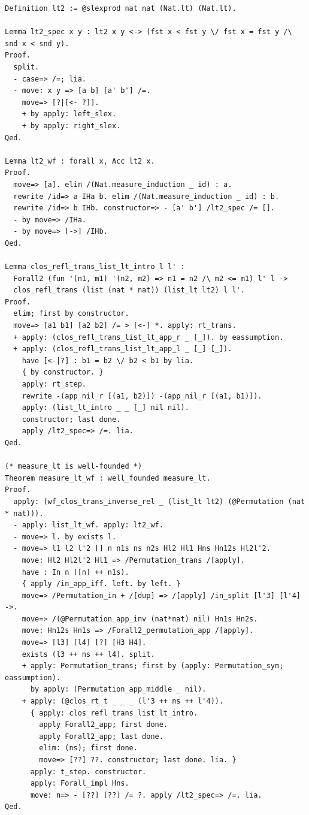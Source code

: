 \documentclass[10pt,a4paper]{article}
\begin{document}
\begin{lstlisting}[style=authorcoq]
Definition lt2 := @slexprod nat nat (Nat.lt) (Nat.lt).

Lemma lt2_spec x y : lt2 x y <-> (fst x < fst y \/ fst x = fst y /\ snd x < snd y).
Proof.
  split.
  - case=> /=; lia.
  - move: x y => [a b] [a' b'] /=.
    move=> [?|[<- ?]].
    + by apply: left_slex.
    + by apply: right_slex.
Qed.

Lemma lt2_wf : forall x, Acc lt2 x.
Proof.
  move=> [a]. elim /(Nat.measure_induction _ id) : a.
  rewrite /id=> a IHa b. elim /(Nat.measure_induction _ id) : b.
  rewrite /id=> b IHb. constructor=> - [a' b'] /lt2_spec /= [].
  - by move=> /IHa.
  - by move=> [->] /IHb.
Qed.

Lemma clos_refl_trans_list_lt_intro l l' :
  Forall2 (fun '(n1, m1) '(n2, m2) => n1 = n2 /\ m2 <= m1) l' l ->
  clos_refl_trans (list (nat * nat)) (list_lt lt2) l l'.
Proof.
  elim; first by constructor.
  move=> [a1 b1] [a2 b2] /= > [<-] *. apply: rt_trans.
  + apply: (clos_refl_trans_list_lt_app_r _ [_]). by eassumption.
  + apply: (clos_refl_trans_list_lt_app_l _ [_] [_]).
    have [<-|?] : b1 = b2 \/ b2 < b1 by lia.
    { by constructor. }
    apply: rt_step.
    rewrite -(app_nil_r [(a1, b2)]) -(app_nil_r [(a1, b1)]).
    apply: (list_lt_intro _ _ [_] nil nil).
    constructor; last done.
    apply /lt2_spec=> /=. lia.
Qed.

(* measure_lt is well-founded *)
Theorem measure_lt_wf : well_founded measure_lt.
Proof.
  apply: (wf_clos_trans_inverse_rel _ (list_lt lt2) (@Permutation (nat * nat))).
  - apply: list_lt_wf. apply: lt2_wf.
  - move=> l. by exists l.
  - move=> l1 l2 l'2 [] n n1s ns n2s Hl2 Hl1 Hns Hn12s Hl2l'2.
    move: Hl2 Hl2l'2 Hl1 => /Permutation_trans /[apply].
    have : In n ([n] ++ n1s).
    { apply /in_app_iff. left. by left. }
    move=> /Permutation_in + /[dup] => /[apply] /in_split [l'3] [l'4] ->.
    move=> /(@Permutation_app_inv (nat*nat) nil) Hn1s Hn2s.
    move: Hn12s Hn1s => /Forall2_permutation_app /[apply].
    move=> [l3] [l4] [?] [H3 H4].
    exists (l3 ++ ns ++ l4). split.
    + apply: Permutation_trans; first by (apply: Permutation_sym; eassumption).
      by apply: (Permutation_app_middle _ nil).
    + apply: (@clos_rt_t _ _ _ (l'3 ++ ns ++ l'4)).
      { apply: clos_refl_trans_list_lt_intro.
        apply Forall2_app; first done.
        apply Forall2_app; last done.
        elim: (ns); first done.
        move=> [??] ??. constructor; last done. lia. }
      apply: t_step. constructor.
      apply: Forall_impl Hns.
      move: n=> - [??] [??] /= ?. apply /lt2_spec=> /=. lia.
Qed.


\end{lstlisting}
\end{document}
